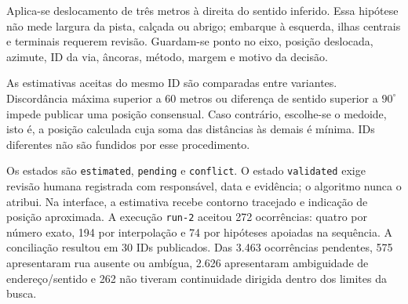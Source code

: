 \documentclass[12pt,oneside,a4paper,brazil]{abntex2}
\begin{document}
\begin{apendicesenv}
Aplica-se deslocamento de três metros à direita do sentido inferido. Essa hipótese não mede largura da pista, calçada ou abrigo; embarque à esquerda, ilhas centrais e terminais requerem revisão. Guardam-se ponto no eixo, posição deslocada, azimute, ID da via, âncoras, método, margem e motivo da decisão.

As estimativas aceitas do mesmo ID são comparadas entre variantes. Discordância máxima superior a 60 metros ou diferença de sentido superior a $90^\circ$ impede publicar uma posição consensual. Caso contrário, escolhe-se o medoide, isto é, a posição calculada cuja soma das distâncias às demais é mínima. IDs diferentes não são fundidos por esse procedimento.

Os estados são \texttt{estimated}, \texttt{pending} e \texttt{conflict}. O estado \texttt{validated} exige revisão humana registrada com responsável, data e evidência; o algoritmo nunca o atribui. Na interface, a estimativa recebe contorno tracejado e indicação de posição aproximada. A execução \texttt{run-2} aceitou 272 ocorrências: quatro por número exato, 194 por interpolação e 74 por hipóteses apoiadas na sequência. A conciliação resultou em 30 IDs publicados. Das 3.463 ocorrências pendentes, 575 apresentaram rua ausente ou ambígua, 2.626 apresentaram ambiguidade de endereço/sentido e 262 não tiveram continuidade dirigida dentro dos limites da busca.


\end{apendicesenv}
\end{document}
